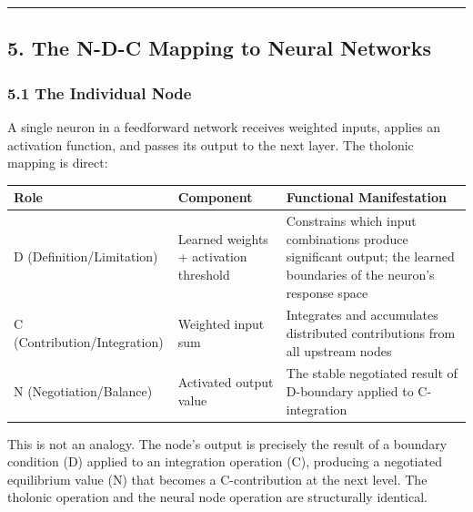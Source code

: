 \documentclass[
  11pt,
  letterpaper,
]{article}
\begin{document}
\begin{center}\rule{0.5\linewidth}{0.5pt}\end{center}

\subsection{5. The N-D-C Mapping to Neural
Networks}\label{the-n-d-c-mapping-to-neural-networks}

\subsubsection{5.1 The Individual Node}\label{the-individual-node}

A single neuron in a feedforward network receives weighted inputs,
applies an activation function, and passes its output to the next layer.
The tholonic mapping is direct:

\begin{longtable}[]{@{}
  >{\raggedright\arraybackslash}p{}
  >{\raggedright\arraybackslash}p{}
  >{\raggedright\arraybackslash}p{}@{}}
\toprule\noalign{}
\begin{minipage}[b]{\linewidth}\raggedright
Role
\end{minipage} & \begin{minipage}[b]{\linewidth}\raggedright
Component
\end{minipage} & \begin{minipage}[b]{\linewidth}\raggedright
Functional Manifestation
\end{minipage} \\
\midrule\noalign{}
\endhead
\bottomrule\noalign{}
\endlastfoot
D (Definition/Limitation) & Learned weights + activation threshold &
Constrains which input combinations produce significant output; the
learned boundaries of the neuron's response space \\
C (Contribution/Integration) & Weighted input sum & Integrates and
accumulates distributed contributions from all upstream nodes \\
N (Negotiation/Balance) & Activated output value & The stable negotiated
result of D-boundary applied to C-integration \\
\end{longtable}

This is not an analogy. The node's output is precisely the result of a
boundary condition (D) applied to an integration operation (C),
producing a negotiated equilibrium value (N) that becomes a
C-contribution at the next level. The tholonic operation and the neural
node operation are structurally identical.
\end{document}
